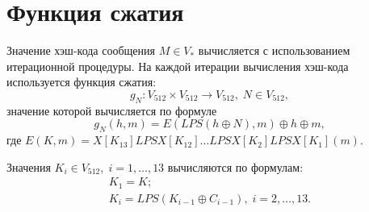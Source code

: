 \section{Функция сжатия}
Значение хэш-кода сообщения $M \in V_* $ вычисляется с использованием итерационной процедуры. На каждой итерации вычисления хэш-кода используется функция сжатия:
\begin{equation}\label{gn}
g_N\colon V_{512} \times V_{512} \to V_{512},\; N \in V_{512},
\end{equation}
значение которой вычисляется по формуле
\begin{equation}\label{E}
g_N(h,m)=E(LPS(h\oplus N),m)\oplus h \oplus m,
\end{equation}
где $E(K,m)=X[K_{13}]LPSX[K_{12}]\dots LPSX[K_2]LPSX[K_1](m)$.
\par
Значения $K_i\in V_{512},\; i=1,\dots,13$ вычисляются по формулам:
\begin{gather}\label{Ki}
K_1=K;\\
K_i=LPS(K_{i-1}\oplus C_{i-1}),\;i=2,\dots,13.
\end{gather}

